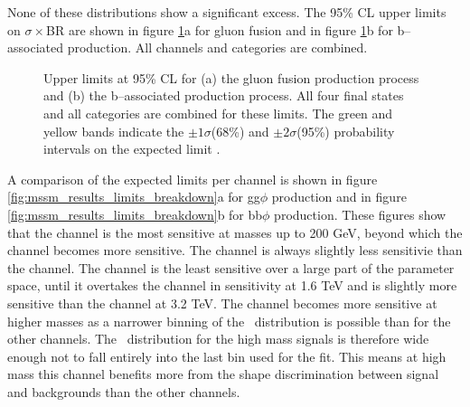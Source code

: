 None of these distributions show a significant excess. The
95\% CL upper limits on $\sigma\times$BR are shown in figure \ref{fig:mssm_results_limits}a
for gluon fusion and in figure \ref{fig:mssm_results_limits}b for b--associated
production. All channels and categories are combined. 
\begin{figure}[h!]
\begin{center}
\end{center}
\caption[Upper limits at 95\% CL for the gluon fusion production process and the
b-associated production process, combining all final states and categories.]{Upper limits at 95\% CL for (a) the gluon fusion production
process and (b) the b--associated production process. All four final states and 
all categories are combined for these limits. The green and yellow bands indicate
the $\pm 1\sigma$(68\%) and $\pm 2\sigma$(95\%) probability intervals on the expected limit \cite{CMS-PAS-HIG-16-037}.}
\label{fig:mssm_results_limits}
\end{figure}

A comparison of the expected limits
per channel is shown in figure \ref{fig:mssm_results_limits_breakdown}a for gg$\phi$ production
and in figure \ref{fig:mssm_results_limits_breakdown}b for bb$\phi$ production.
These figures show that the \mutau channel is the most sensitive at masses up to 
200 GeV, beyond which the \tautau channel becomes more sensitive. The \etau
channel is always slightly less sensitivie than the \mutau channel. The \emu channel
is the least sensitive over a large part of the parameter space, until it overtakes the 
\etau channel in sensitivity at 1.6 TeV and is slightly more sensitive than the
\mutau channel at 3.2 TeV. The \emu channel becomes more sensitive at higher masses as
a narrower binning of the \mTtot~distribution is possible than for the other channels.
The \mTtot~distribution for the high mass signals is therefore wide enough not to
fall entirely into the last bin used for the fit. This means at high mass this channel
benefits more from the shape discrimination between signal and backgrounds than
the other channels.

